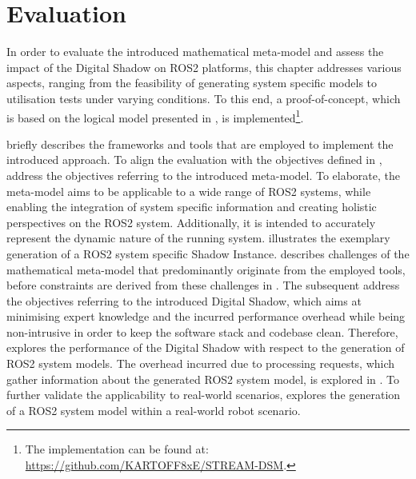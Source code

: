 \cleardoublepage
\chapter{Evaluation} \label{chap:evaluation}
In order to evaluate the introduced mathematical meta-model and assess the impact of the Digital Shadow on ROS2 platforms, this chapter addresses various aspects, ranging from the feasibility of generating system specific models to utilisation tests under varying conditions. To this end, a proof-of-concept, which is based on the logical model presented in , is implemented\footnote{The implementation can be found at: \url{https://github.com/KARTOFF8xE/STREAM-DSM}.}.

 briefly describes the frameworks and tools that are employed to implement the introduced approach. To align the evaluation with the objectives defined in ,  address the objectives referring to the introduced meta-model. To elaborate, the meta-model aims to be applicable to a wide range of ROS2 systems, while enabling the integration of system specific information and creating holistic perspectives on the ROS2 system. Additionally, it is intended to accurately represent the dynamic nature of the running system.  illustrates the exemplary generation of a ROS2 system specific Shadow Instance.  describes challenges of the mathematical meta-model that predominantly originate from the employed tools, before constraints are derived from these challenges in .\newline
The subsequent  address the objectives referring to the introduced Digital Shadow, which aims at minimising expert knowledge and the incurred performance overhead while being non-intrusive in order to keep the software stack and codebase clean. Therefore,  explores the performance of the Digital Shadow with respect to the generation of ROS2 system models. The overhead incurred due to processing requests, which gather information about the generated ROS2 system model, is explored in .\newline
To further validate the applicability to real-world scenarios,  explores the generation of a ROS2 system model within a real-world robot scenario.


